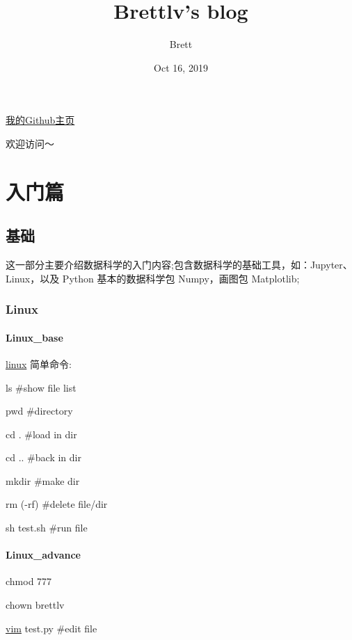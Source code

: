 \documentclass[letterpaper,10pt,english]{sphinxmanual}
\title{Brettlv's blog}
\date{Oct 16, 2019}
\author{Brett}
\begin{document}
\maketitle
\sphinxtableofcontents
{}\label{\detokenize{index::doc}}


\href{https://brettlv.github.io/}{我的Github主页}

欢迎访问～


\chapter{入门篇}
\label{\detokenize{base/index:welcome-to-brettlv-s-blog}}\label{\detokenize{base/index::doc}}\label{\detokenize{base/index:id1}}

\section{基础}
\label{\detokenize{base/index:id2}}
这一部分主要介绍数据科学的入门内容;包含数据科学的基础工具，如：Jupyter、Linux，以及 Python 基本的数据科学包 Numpy，画图包 Matplotlib;


\subsection{Linux}
\label{\detokenize{base/01_linux::doc}}\label{\detokenize{base/01_linux:linux}}

\subsubsection{Linux\_base}
\label{\detokenize{base/01_linux:linux-base}}
\href{https://www.tecmint.com/linux-commands-cheat-sheet/}{linux} 简单命令:

ls \#show file list

pwd \#directory

cd . \#load in dir

cd .. \#back in dir

mkdir \#make dir

rm (-rf) \#delete file/dir

sh test.sh \#run file


\subsubsection{Linux\_advance}
\label{\detokenize{base/01_linux:linux-advance}}
chmod 777

chown brettlv

\href{https://www.runoob.com/linux/linux-vim.html}{vim} test.py \#edit file
\end{document}

